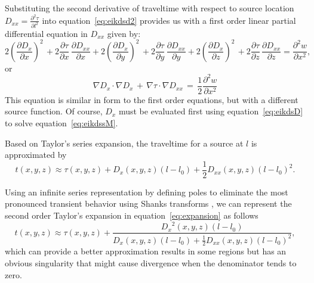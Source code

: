Substituting the second derivative of traveltime with respect to
source location $D_{xx}=\frac{\partial^2 \tau}{\partial l^2}$ into
equation~\ref{eq:eikdsd2} provides us with a first order linear
partial differential equation in $D_{xx}$ given by:
\begin{equation}
2 \left(\frac{\partial D_x}{\partial x}\right)^2 \, + 
2 \frac{\partial \tau}{\partial x} \, \frac{\partial D_{xx}}{\partial x} + 
2 \left(\frac{\partial D_x}{\partial y}\right)^2 \, +
2 \frac{\partial \tau}{\partial y} \, \frac{\partial D_{xx}}{\partial y}+
2 \left(\frac{\partial D_x}{\partial z}\right)^2 \, +
2 \frac{\partial \tau}{\partial z} \, \frac{\partial D_{xx}}{\partial z} = \frac{\partial^2 w}{\partial x^2},
\label{eq:eikdsdd2}
\end{equation}
or
\begin{equation}
\nabla D_x \cdot \nabla D_x \, + \,\nabla \tau \cdot \nabla D_{xx} \, = \, \frac{1}{2} \frac{\partial^2 w}{\partial x^2}
\label{eq:eikdssM}
\end{equation}
This equation is similar in form to the first order equations, but
with a different source function. Of course, $D_x$ must be evaluated
first using equation~\ref{eq:eikdsD} to solve
equation~\ref{eq:eikdssM}.

Based on Taylor's series expansion, the traveltime for a source at $l$ is approximated by
\begin{equation}
t(x,y,z) \approx \tau(x,y,z) + D_x(x,y,z) (l-l_0)+ \frac{1}{2} D_{xx}(x,y,z) (l-l_0)^2.
\label{eq:expansion}
\end{equation}

Using an infinite series representation by defining poles to eliminate
the most pronounced transient behavior using Shanks transforms \cite[]{Bender}, we can
represent the second order Taylor's expansion in
equation~\ref{eq:expansion} as follows
\begin{equation}
t(x,y,z) \approx \tau(x,y,z) + \frac{{D_x}^2(x,y,z) (l-l_0)}{D_x(x,y,z) (l-l_0)+ \frac{1}{2} D_{xx}(x,y,z) (l-l_0)^2},
\label{eq:expansion2}
\end{equation}
which can provide a better approximation results in some regions but has an obvious singularity that might cause divergence when the denominator tends to zero.


